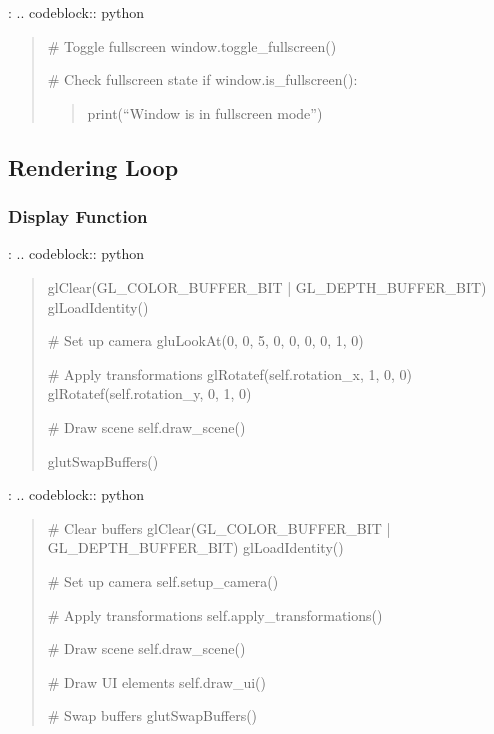 \documentclass[a4paper,10pt,english,openany,oneside]{sphinxmanual}
\begin{document}
\sphinxAtStartPar
{}:
.. code\sphinxhyphen{}block:: python
\begin{quote}

\sphinxAtStartPar
\# Toggle fullscreen
window.toggle\_fullscreen()

\sphinxAtStartPar
\# Check fullscreen state
if window.is\_fullscreen():
\begin{quote}

\sphinxAtStartPar
print(“Window is in fullscreen mode”)
\end{quote}
\end{quote}


\subsection{Rendering Loop}
\label{\detokenize{api/ui:rendering-loop}}

\subsubsection{Display Function}
\label{\detokenize{api/ui:display-function}}
\sphinxAtStartPar
{}:
.. code\sphinxhyphen{}block:: python
\begin{quote}
\begin{description}
\sphinxAtStartPar
glClear(GL\_COLOR\_BUFFER\_BIT | GL\_DEPTH\_BUFFER\_BIT)
glLoadIdentity()

\sphinxAtStartPar
\# Set up camera
gluLookAt(0, 0, 5, 0, 0, 0, 0, 1, 0)

\sphinxAtStartPar
\# Apply transformations
glRotatef(self.rotation\_x, 1, 0, 0)
glRotatef(self.rotation\_y, 0, 1, 0)

\sphinxAtStartPar
\# Draw scene
self.draw\_scene()

\sphinxAtStartPar
glutSwapBuffers()

\end{description}
\end{quote}

\sphinxAtStartPar
{}:
.. code\sphinxhyphen{}block:: python
\begin{quote}
\begin{description}
\sphinxAtStartPar
\# Clear buffers
glClear(GL\_COLOR\_BUFFER\_BIT | GL\_DEPTH\_BUFFER\_BIT)
glLoadIdentity()

\sphinxAtStartPar
\# Set up camera
self.setup\_camera()

\sphinxAtStartPar
\# Apply transformations
self.apply\_transformations()

\sphinxAtStartPar
\# Draw scene
self.draw\_scene()

\sphinxAtStartPar
\# Draw UI elements
self.draw\_ui()

\sphinxAtStartPar
\# Swap buffers
glutSwapBuffers()

\end{description}
\end{quote}
\end{document}
